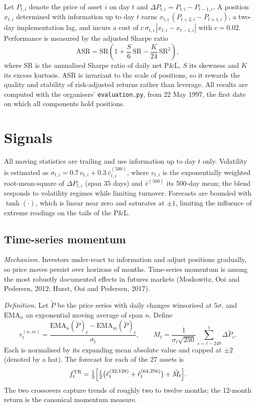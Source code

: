 \documentclass[10.5pt,a4paper]{article}
\begin{document}
Let $P_{t,i}$ denote the price of asset $i$ on day $t$ and $\Delta P_{t,i}=P_{t,i}-P_{t-1,i}$. A position $x_{t,i}$ determined with information up to day $t$ earns $x_{t,i}\,(P_{t+2,i}-P_{t+1,i})$, a two-day implementation lag, and incurs a cost of $c\,\sigma_{t,i}\,|x_{t,i}-x_{t-1,i}|$ with $c=0.02$. Performance is measured by the adjusted Sharpe ratio
\begin{equation}
\mathrm{ASR}=\mathrm{SR}\left(1+\frac{S}{6}\,\mathrm{SR}-\frac{K}{24}\,\mathrm{SR}^2\right),
\end{equation}
where SR is the annualised Sharpe ratio of daily net P\&L, $S$ its skewness and $K$ its excess kurtosis. ASR is invariant to the scale of positions, so it rewards the quality and stability of risk-adjusted returns rather than leverage. All results are computed with the organisers' \texttt{evaluation.py}, from 22 May 1997, the first date on which all components hold positions.

\section{Signals}
All moving statistics are trailing and use information up to day $t$ only. Volatility is estimated as $\sigma_{t,i}=0.7\,v_{t,i}+0.3\,\bar v^{(500)}_{t,i}$, where $v_{t,i}$ is the exponentially weighted root-mean-square of $\Delta P_{t,i}$ (span 35 days) and $\bar v^{(500)}$ its 500-day mean; the blend responds to volatility regimes while limiting turnover. Forecasts are bounded with $\tanh(\cdot)$, which is linear near zero and saturates at $\pm1$, limiting the influence of extreme readings on the tails of the P\&L.

\subsection{Time-series momentum}
\textit{Mechanism.} Investors under-react to information and adjust positions gradually, so price moves persist over horizons of months. Time-series momentum is among the most robustly documented effects in futures markets (Moskowitz, Ooi and Pedersen, 2012; Hurst, Ooi and Pedersen, 2017).

\textit{Definition.} Let $\tilde P$ be the price series with daily changes winsorised at $5\sigma$, and $\mathrm{EMA}_n$ an exponential moving average of span $n$. Define
\begin{equation}
r^{(n,m)}_{t}=\frac{\mathrm{EMA}_n(\tilde P)_t-\mathrm{EMA}_m(\tilde P)_t}{\sigma_t},\qquad
M_t=\frac{1}{\sigma_t\sqrt{250}}\sum_{s=t-249}^{t}\Delta\tilde P_s .
\end{equation}
Each is normalised by its expanding mean absolute value and capped at $\pm2$ (denoted by a hat). The forecast for each of the 27 assets is
\begin{equation}
f^{\mathrm{TR}}_t=\tfrac12\Bigl[\tfrac12\bigl(\hat r^{(32,128)}_t+\hat r^{(64,256)}_t\bigr)+\hat M_t\Bigr].
\end{equation}
The two crossovers capture trends of roughly two to twelve months; the 12-month return is the canonical momentum measure.
\end{document}
